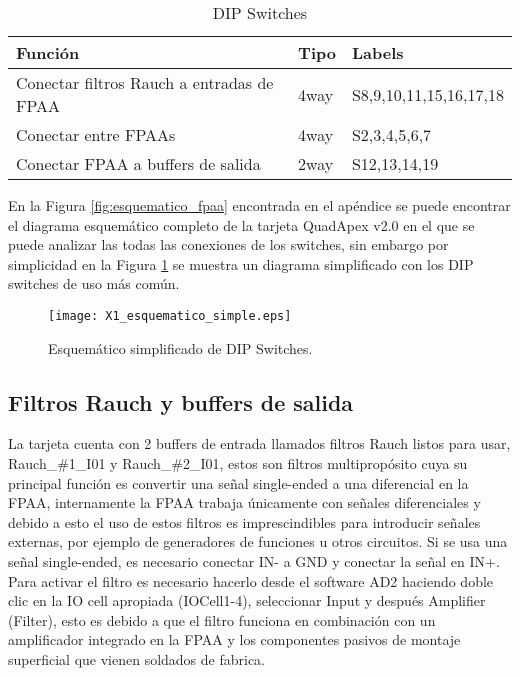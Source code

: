 	\begin{table}[!ht]
		\centering
		\begin{tabular}{|l|l|l|}
			\hline
			\textbf{Función} &  \textbf{Tipo} & \textbf{Labels}\\
			\hline
			Conectar filtros Rauch a entradas de FPAA 					& 4way 		& S8,9,10,11,15,16,17,18		\\
			\hline
			Conectar entre FPAAs 										& 4way 		& S2,3,4,5,6,7					\\
			\hline
			Conectar FPAA a buffers de salida 							& 2way 		& S12,13,14,19					\\
			\hline
		\end{tabular}
		\caption{DIP Switches}
		\label{tab:switches}
	\end{table}
	
	En la Figura \ref{fig:esquematico_fpaa} encontrada en el apéndice se puede encontrar el diagrama esquemático completo de la tarjeta QuadApex v2.0 en el que se puede analizar las todas las conexiones de los switches, sin embargo por simplicidad en la Figura \ref{fig:X1_esquematico_simple} se muestra un diagrama simplificado con los DIP switches de uso más común.
	
	\begin{figure}[!ht] 
		\caption{Esquemático simplificado de DIP Switches.}
		\label{fig:X1_esquematico_simple}
		\centering
		\texttt{[image: X1\_esquematico\_simple.eps]}
	\end{figure}
	
		\subsection{Filtros Rauch y buffers de salida}\label{sec:rauch}
	
	La tarjeta cuenta con 2 buffers de entrada llamados filtros Rauch listos para usar, Rauch\_\#1\_I01 y Rauch\_\#2\_I01, estos son filtros multipropósito cuya su principal función es convertir una señal single-ended a una diferencial en la FPAA, internamente la FPAA trabaja únicamente con señales diferenciales y debido a esto el uso de estos filtros es imprescindibles para introducir señales externas, por ejemplo de generadores de funciones u otros circuitos. Si se usa una señal single-ended, es necesario conectar IN- a GND y conectar la señal en IN+.
	Para activar el filtro es necesario hacerlo desde el software AD2 haciendo doble clic en la IO cell apropiada (IOCell1-4), seleccionar Input y después Amplifier (Filter), esto es debido a que el filtro funciona en combinación con un amplificador integrado en la FPAA y los componentes pasivos de montaje superficial que vienen soldados de fabrica.
	
